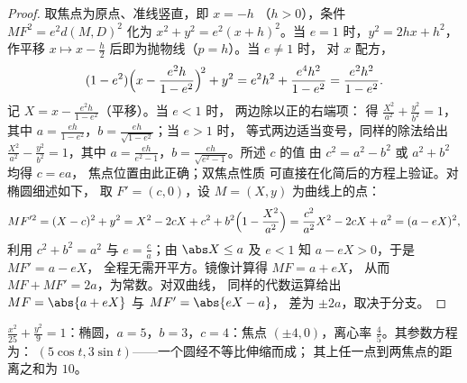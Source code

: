 \begin{proof}
取焦点为原点、准线竖直，即 $x = -h$
（$h > 0$），条件 $MF^2 = e^2 d(M, D)^2$ 化为 $x^2 + y^2 =
e^2 (x + h)^2$。当 $e = 1$ 时，$y^2 = 2hx + h^2$，
作平移 $x \mapsto x - \frac h2$ 后即为抛物线（$p = h$）。当 $e \neq 1$ 时，
对 $x$ 配方，
\[
(1 - e^2)\Bigl(x - \frac{e^2 h}{1 - e^2}\Bigr)^{\!2} + y^2
= e^2h^2 + \frac{e^4 h^2}{1 - e^2}
= \frac{e^2 h^2}{1 - e^2} .
\]
记 $X = x - \frac{e^2h}{1-e^2}$（平移）。当 $e < 1$ 时，
两边除以正的右端项：
得 $\frac{X^2}{a^2} + \frac{y^2}{b^2} = 1$，其中 $a = \frac{eh}{1 -
e^2}$，$b = \frac{eh}{\sqrt{1-e^2}}$；当 $e > 1$ 时，
等式两边适当变号，同样的除法给出
$\frac{X^2}{a^2} - \frac{y^2}{b^2} = 1$，其中 $a = \frac{eh}{e^2 -
1}$，$b = \frac{eh}{\sqrt{e^2 - 1}}$。所述 $c$ 的值
由 $c^2 = a^2 - b^2$ 或 $a^2 + b^2$ 均得 $c = ea$，
焦点位置由此正确；双焦点性质
可直接在化简后的方程上验证。对椭圆细述如下，
取 $F' = (c, 0)$，设 $M = (X, y)$ 为曲线上的点：
\[
MF'^2 = (X - c)^2 + y^2
= X^2 - 2cX + c^2 + b^2\Bigl(1 - \frac{X^2}{a^2}\Bigr)
= \frac{c^2}{a^2}X^2 - 2cX + a^2
= (a - eX)^2 ,
\]
利用 $c^2 + b^2 = a^2$ 与 $e = \frac ca$；由 $\abs X \leq
a$ 及 $e < 1$ 知 $a - eX > 0$，于是 $MF' = a - eX$，
全程无需开平方。镜像计算得 $MF = a + eX$，
从而 $MF + MF' = 2a$，为常数。对双曲线，
同样的代数运算给出 $MF = \abs{a + eX}$ 与 $MF' = \abs{eX - a}$，
差为 $\pm2a$，取决于分支。
\end{proof}

\begin{example}\label{ex:b1:curves:conicexample}
$\frac{x^2}{25} + \frac{y^2}{9} = 1$：椭圆，$a = 5$，$b = 3$，$c
= 4$：焦点 $(\pm4, 0)$，离心率 $\frac45$。其参数方程为：
$(5\cos t, 3\sin t)$——一个圆经不等比伸缩而成；
其上任一点到两焦点的距离之和为 $10$。
\end{example}

